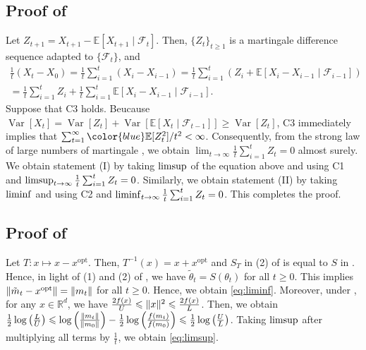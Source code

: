 \documentclass[journal]{IEEEtran}
\providecommand{\limsup}{\operatornamewithlimits{limsup}} %
\providecommand{\liminf}{\operatornamewithlimits{liminf}} %
\DeclareMathOperator{\Var}{Var}   %
\providecommand{\R}{\mathbb{R}} %
\providecommand{\E}{\mathbb{E}} %
\renewcommand{\geq}{\geqslant} %
\renewcommand{\leq}{\leqslant} %
\DeclarePairedDelimiter{\norm}{\lVert}{\rVert}
\theoremstyle{definition}
\begin{document}
\subsection{Proof of }\label{apdx:prop:convergence_rate}
Let $Z_{t+1} = X_{t+1} - \E[X_{t+1} \mid \mathcal{F}_t]$.
Then, $\{Z_{t}\}_{t \geq 1}$ is a martingale difference sequence adapted to $\{\mathcal{F}_{t}\}$, and
\begin{multline}
\frac1t (X_t - X_0)
= \frac1t \sum_{i=1}^{t}(X_i - X_{i-1})
= \frac1t \sum_{i=1}^{t}(Z_i + \E[X_i - X_{i-1} \mid \mathcal{F}_{i-1}])
\\
= \frac1t \sum_{i=1}^{t}Z_i + \frac1t \sum_{i=1}^{t} \E[X_i - X_{i-1} \mid \mathcal{F}_{i-1}]
.
\end{multline}
Suppose that C3 holds.
{\color{blue}Beucause $\Var[X_t] = \Var[Z_t] + \Var[\E[X_t\mid\mathcal{F}_{t-1}]] \geq \Var[Z_t]$, }
C3 immediately implies that $\sum_{t=1}^{\infty}{\color{blue}\E[Z_{t}^2]} / t^2 < \infty$. Consequently, from the strong law of large numbers of martingale \cite{chow1967strong}, we obtain $\lim_{t\to\infty} \frac1t \sum_{i=1}^{t} Z_t = 0$ almost surely. 
We obtain statement (I) by taking $\limsup$ of the equation above and using C1 and $\limsup_{t\to\infty} \frac1t \sum_{i=1}^{t} Z_t = 0$.
Similarly, we obtain statement (II) by taking $\liminf$ and using C2 and $\liminf_{t\to\infty} \frac1t \sum_{i=1}^{t} Z_t = 0$. This completes the proof.

\subsection{Proof of }\label{apdx:prop:f-norm}
Let $T: x \mapsto x - x^\text{opt}$. Then, $T^{-1}(x) = x + x^\text{opt}$ and $S_T$ in (2) of  is equal to $S$ in .
Hence, in light of (1) and (2) of , we have $\tilde{\theta}_t = S(\theta_t)$ for all $t \geq 0$.
This implies $\norm{\tilde{m}_t - x^\mathrm{opt}} = \norm{m_t}$ for all $t \geq 0$. Hence, we obtain \eqref{eq:liminf}. 
Moreover, under , for any $x \in \R^d$, we have
$\frac{2 f(x)}{ U } \leq \norm{x}^2 \leq \frac{2 f(x)}{ L }$.
Then, we obtain
$\frac{1}{2}\log \left(\frac{L}{U}\right)
\leq \log\left(\frac{ \norm{m_t}} { \norm{m_0} }\right) - \frac{1}{2}\log\left(\frac{f(m_t)}{f(m_0)}\right)
\leq \frac{1}{2}\log \left(\frac{U}{L}\right)$.
Taking $\limsup$ after multiplying all terms by $\frac{1}{t}$, we obtain \eqref{eq:limsup}.
\end{document}
